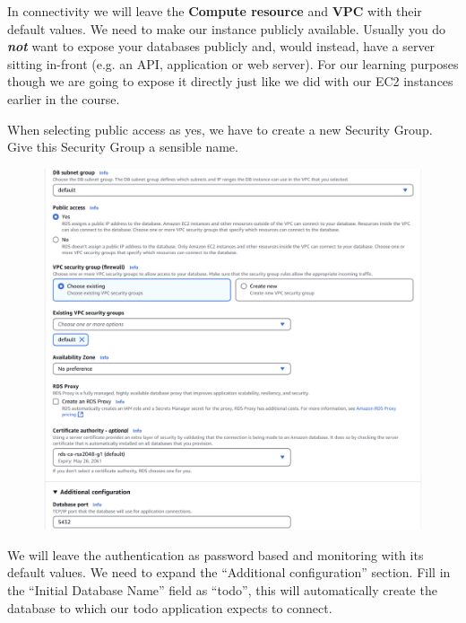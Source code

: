 \documentclass{csse4400}
\begin{document}

\noindent
In connectivity we will leave the \textbf{Compute resource} and \textbf{VPC} with their default values.
We need to make our instance publicly available.
Usually you do \textbf{\textit{not}} want to expose your databases publicly and,
would instead, have a server sitting in-front (e.g. an API, application or web server).
For our learning purposes though we are going to expose it directly just like we did with our EC2 instances earlier in the course.

When selecting public access as yes, we have to create a new Security Group.
Give this Security Group a sensible name.

\begin{figure}[H]
  \includegraphics[width=\textwidth]{images/db6}
\end{figure}

\noindent
We will leave the authentication as password based and monitoring with its default values.
We need to expand the ``Additional configuration'' section.
Fill in the ``Initial Database Name'' field as ``todo'',
this will automatically create the database to which our todo application expects to connect.

\end{document}
